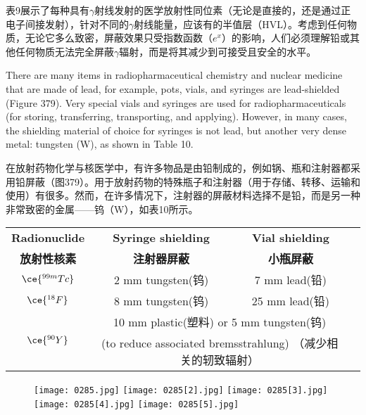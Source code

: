 \documentclass[dvipsnames, svgnames,a4paper,11pt]{article}
\begin{document}
表9展示了每种具有$\gamma$射线发射的医学放射性同位素（无论是直接的，还是通过正电子间接发射），针对不同的$\gamma$射线能量，应该有的半值层（HVL）。考虑到任何物质，无论它多么致密，屏蔽效果只受指数函数（\( e^x \)）的影响，人们必须理解铅或其他任何物质无法完全屏蔽$\gamma$辐射，而是将其减少到可接受且安全的水平。

There are many items in radiopharmaceutical chemistry and nuclear medicine that are made of lead, for example, pots, vials, and syringes are lead-shielded (Figure 379). Very special vials and syringes are used for radiopharmaceuticals (for storing, transferring, transporting, and applying). However, in many cases, the shielding material of choice for syringes is not lead, but another very dense metal: tungsten (W), as shown in Table 10.

在放射药物化学与核医学中，有许多物品是由铅制成的，例如锅、瓶和注射器都采用铅屏蔽（图379）。用于放射药物的特殊瓶子和注射器（用于存储、转移、运输和使用）有很多。然而，在许多情况下，注射器的屏蔽材料选择不是铅，而是另一种非常致密的金属——钨（W），如表10所示。

\begin{table}[htbp]
\centering
{}\label{table10}

\begin{tabular}{cccc}
\toprule
\textbf{Radionuclide} & \textbf{Syringe shielding} & \textbf{Vial shielding} \\
\textbf{放射性核素} & \textbf{注射器屏蔽} & \textbf{小瓶屏蔽} \\
\midrule
\(\ce{^{99m}Tc}\) & 2 mm tungsten(钨) & 7 mm lead(铅) \\
\(\ce{^{18}F}\) & 8 mm tungsten(钨) & 25 mm lead(铅) \\
\multirow{2}{*}{\(\ce{^{90}Y}\)} &\multicolumn{2}{c}{10 mm plastic(塑料) or 5 mm tungsten(钨)}&\\
& \multicolumn{2}{c}{(to reduce associated bremsstrahlung) （减少相关的轫致辐射）}& \\
\bottomrule
\end{tabular}
\end{table}

\begin{figure}[h]
    \centering
    \texttt{[image: 0285.jpg]} \hspace{0.2in}
    \texttt{[image: 0285[2].jpg]} \hspace{0.2in}
    \texttt{[image: 0285[3].jpg]}  \hspace{0.2in}
    \texttt{[image: 0285[4].jpg]}  \hspace{0.2in}
    \texttt{[image: 0285[5].jpg]} 
     \label{fig379}
\end{figure}
\end{document}
